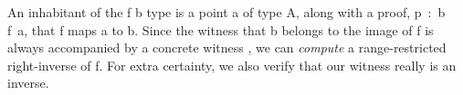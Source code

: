 An inhabitant of the  \ab f  \ab b type is a point \ab a of type \ab A,
along with a proof, \ab p~\as :~\ab b  \ab f~\ab a, that \ab f maps \ab a to \ab b.
Since the witness that \ab b
belongs to the image of \ab f is always accompanied by a concrete witness , we can
\emph{compute} a range-restricted right-inverse of \ab f.  For extra certainty, we also verify
that our witness really is an inverse.

\begin{code}%
\>[0]\<%
\\
\>[0][@{}l@{\AgdaIndent{1}}]%
\>[1]\AgdaSpace{}%
\AgdaSymbol{:}\AgdaSpace{}%
\AgdaSymbol{(}\AgdaSpace{}%
\AgdaSymbol{:}\AgdaSpace{}%
\AgdaSpace{}%
\AgdaSpace{}%
\AgdaSymbol{)\{}\AgdaSpace{}%
\AgdaSymbol{:}\AgdaSpace{}%
\AgdaSymbol{\}}\AgdaSpace{}%
\AgdaSpace{}%
\AgdaSpace{}%
\AgdaSpace{}%
\AgdaSpace{}%
\AgdaSpace{}%
\AgdaSpace{}%
\AgdaSpace{}%
\<%
\\
%
\>[1]\AgdaSpace{}%
\AgdaSymbol{\AgdaUnderscore{}}\AgdaSpace{}%
\AgdaSymbol{(}\AgdaSpace{}%
\AgdaSpace{}%
\AgdaSymbol{\AgdaUnderscore{})}\AgdaSpace{}%
\AgdaSymbol{=}\AgdaSpace{}%
\<%
\\
%
\\[\AgdaEmptyExtraSkip]%
%
\>[1]\AgdaSpace{}%
\AgdaSymbol{:}\AgdaSpace{}%
\AgdaSymbol{\{}\AgdaSpace{}%
\AgdaSymbol{:}\AgdaSpace{}%
\AgdaSpace{}%
\AgdaSpace{}%
\AgdaSymbol{\}\{}\AgdaSpace{}%
\AgdaSymbol{:}\AgdaSpace{}%
\AgdaSymbol{\}(}\AgdaSpace{}%
\AgdaSymbol{:}\AgdaSpace{}%
\AgdaSpace{}%
\AgdaSpace{}%
\AgdaSpace{}%
\AgdaSymbol{)}\AgdaSpace{}%
\AgdaSpace{}%
\AgdaSpace{}%
\AgdaSpace{}%
\AgdaSymbol{(}\AgdaSpace{}%
\AgdaSpace{}%
\AgdaSymbol{)}\AgdaSpace{}%
\AgdaSpace{}%
\<%
\\
%
\>[1]\AgdaSpace{}%
\AgdaSymbol{(}\AgdaSpace{}%
\AgdaSymbol{\AgdaUnderscore{}}\AgdaSpace{}%
\AgdaSymbol{)}\AgdaSpace{}%
\AgdaSymbol{=}\AgdaSpace{}%
\AgdaSpace{}%
\<%
\end{code}

